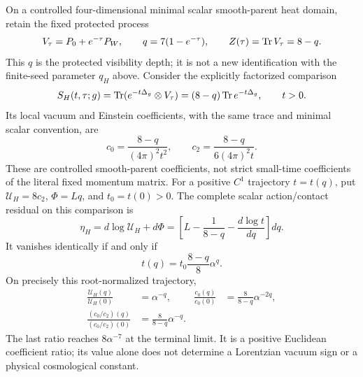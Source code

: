 \documentclass[12pt,a4paper]{article}
\begin{document}
\begin{theorem}
\label{p3e:thm:v2218-factorized-heat-clock}
On a controlled four-dimensional minimal scalar smooth-parent heat
domain, retain the fixed protected process
\[
 V_\tau=P_0+e^{-\tau}P_W,\qquad
 q=7(1-e^{-\tau}),\qquad Z(\tau)=\operatorname{Tr} V_\tau=8-q.
\]
This \(q\) is the protected visibility depth; it is not a new
identification with the finite-seed parameter \(q_H\) above.
Consider the explicitly factorized comparison
\begin{equation}
 \label{p3e:eq:v2218-factorized-heat-comparison}
 S_H(t,\tau;g)=\operatorname{Tr}(e^{-t\Delta_g}\otimes V_\tau)
 =(8-q)\operatorname{Tr} e^{-t\Delta_g},\qquad t>0.
\end{equation}
Its local vacuum and Einstein coefficients, with the same trace and
minimal scalar convention, are
\begin{equation}
 \label{p3e:eq:v2218-factorized-heat-coefficients}
 c_0=\frac{8-q}{(4\pi)^2t^2},\qquad
 c_2=\frac{8-q}{6(4\pi)^2t}.
\end{equation}
These are controlled smooth-parent coefficients, not strict
small-time coefficients of the literal fixed momentum matrix.
For a positive \(C^1\) trajectory \(t=t(q)\), put
\(\mathcal U_H=8c_2\), \(\Phi=Lq\), and \(t_0=t(0)>0\).
The complete scalar action/contact residual on this comparison is
\begin{equation}
 \label{p3e:eq:v2218-factorized-contact-residual}
 \boxed{\eta_H=d\log\mathcal U_H+d\Phi
 =\left[L-\frac1{8-q}-\frac{d\log t}{dq}\right]dq.}
\end{equation}
It vanishes identically if and only if
\begin{equation}
 \label{p3e:eq:v2218-forced-heat-clock}
 \boxed{t(q)=t_0\frac{8-q}{8}\alpha^q.}
\end{equation}
On precisely this root-normalized trajectory,
\begin{align}
 \label{p3e:eq:v2218-heat-clock-coefficient-ratios}
 \frac{\mathcal U_H(q)}{\mathcal U_H(0)}&=\alpha^{-q},&
 \frac{c_0(q)}{c_0(0)}&=\frac8{8-q}\alpha^{-2q},\\
 \label{p3e:eq:v2218-heat-clock-offset-ratio}
 \frac{(c_0/c_2)(q)}{(c_0/c_2)(0)}
 &=\frac8{8-q}\alpha^{-q}.&&
\end{align}
The last ratio reaches \(8\alpha^{-7}\) at the terminal limit.
It is a positive Euclidean coefficient ratio; its value alone does
not determine a Lorentzian vacuum sign or a physical cosmological
constant.
\end{theorem}
\end{document}
